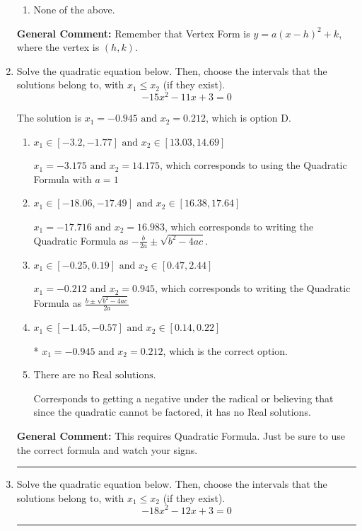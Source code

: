 \documentclass{extbook}[14pt]
\newcommand{\litem}[1]{\item #1

\rule{\textwidth}{0.4pt}}
\begin{document}
\begin{enumerate}
{\begin{enumerate}[label=\Alph*.]
\item None of the above.\end{enumerate}
\textbf{General Comment:} Remember that Vertex Form is $y = a(x-h)^2+k$, where the vertex is $(h, k)$.
}
\litem{
Solve the quadratic equation below. Then, choose the intervals that the solutions belong to, with $x_1 \leq x_2$ (if they exist).
\[ -15x^{2} -11 x + 3 = 0 \]

The solution is \( x_1 = -0.945 \text{ and } x_2 = 0.212 \), which is option D.\begin{enumerate}[label=\Alph*.]
\item \( x_1 \in [-3.2, -1.77] \text{ and } x_2 \in [13.03, 14.69] \)

 $x_1 = -3.175 \text{ and } x_2 = 14.175$, which corresponds to using the Quadratic Formula with $a=1$
\item \( x_1 \in [-18.06, -17.49] \text{ and } x_2 \in [16.38, 17.64] \)

 $x_1 = -17.716 \text{ and } x_2 = 16.983$, which corresponds to writing the Quadratic Formula as $-\frac{b}{2a} \pm \sqrt{b^2 - 4ac}$.
\item \( x_1 \in [-0.25, 0.19] \text{ and } x_2 \in [0.47, 2.44] \)

 $x_1 = -0.212 \text{ and } x_2 = 0.945$, which corresponds to writing the Quadratic Formula as $\frac{b \pm \sqrt{b^2 - 4ac}}{2a}$
\item \( x_1 \in [-1.45, -0.57] \text{ and } x_2 \in [0.14, 0.22] \)

* $x_1 = -0.945 \text{ and } x_2 = 0.212$, which is the correct option.
\item \( \text{There are no Real solutions.} \)

Corresponds to getting a negative under the radical or believing that since the quadratic cannot be factored, it has no Real solutions.
\end{enumerate}

\textbf{General Comment:} This requires Quadratic Formula. Just be sure to use the correct formula and watch your signs.
}
\litem{
Solve the quadratic equation below. Then, choose the intervals that the solutions belong to, with $x_1 \leq x_2$ (if they exist).
\[ -18x^{2} -12 x + 3 = 0 \]

}
\end{enumerate}
\end{document}
